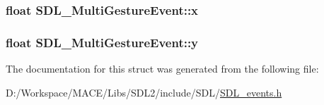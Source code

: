 \subsubsection[{\texorpdfstring{x}{x}}]{\setlength{\rightskip}{0pt plus 5cm}float S\+D\+L\+\_\+\+Multi\+Gesture\+Event\+::x}\hypertarget{struct_s_d_l___multi_gesture_event_a1708fc3c788fd12cc0beb5dc05cf31ca}{}\label{struct_s_d_l___multi_gesture_event_a1708fc3c788fd12cc0beb5dc05cf31ca}
\subsubsection[{\texorpdfstring{y}{y}}]{\setlength{\rightskip}{0pt plus 5cm}float S\+D\+L\+\_\+\+Multi\+Gesture\+Event\+::y}\hypertarget{struct_s_d_l___multi_gesture_event_a264602b9c5cc027eb6a283adda428454}{}\label{struct_s_d_l___multi_gesture_event_a264602b9c5cc027eb6a283adda428454}


The documentation for this struct was generated from the following file\+:\begin{DoxyCompactItemize}
\item 
D\+:/\+Workspace/\+M\+A\+C\+E/\+Libs/\+S\+D\+L2/include/\+S\+D\+L/\hyperlink{_s_d_l__events_8h}{S\+D\+L\+\_\+events.\+h}\end{DoxyCompactItemize}
